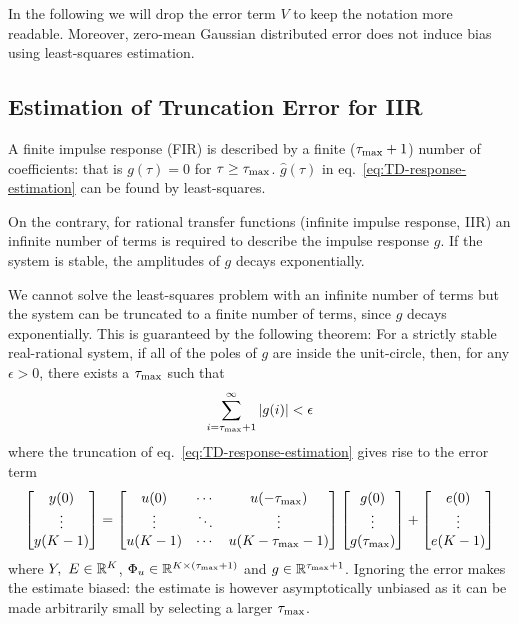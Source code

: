 In the following we will drop the error term $V$ to keep the notation more readable. Moreover, zero-mean Gaussian distributed error does not induce bias using least-squares estimation.

\subsection{Estimation of Truncation Error for IIR}
\label{sec:truncation-error-estimation}

A finite impulse response (FIR) is described by a finite ($\tau_\text{max}+1$) number of coefficients: that is $g(\tau) = 0$ for $\tau \ge \tau_\text{max}$. $\hat{g}(\tau)$ in eq.~\eqref{eq:TD-response-estimation} can be found by least-squares.

On the contrary, for rational transfer functions (infinite impulse response, IIR) an infinite number of terms is required to describe the impulse response $g$. If the system is stable, the amplitudes of $g$ decays exponentially.

We cannot solve the least-squares problem with an infinite number of terms but the system can be truncated to a finite number of terms, since $g$ decays exponentially. This is guaranteed by the following theorem: For a strictly stable real-rational system, if all of the poles of $g$ are inside the unit-circle, then, for any $\epsilon>0$, there exists a $\tau_\text{max}$ such that
\begin{equation*}
  \sum_{i=\tau_\text{max}+1}^\infty |g(i)| < \epsilon
\end{equation*}
where the truncation of eq.~\eqref{eq:TD-response-estimation} gives rise to the error term
\begin{align*}
  \begin{bmatrix}
    y(0) \\ \vdots \\ y(K-1)
  \end{bmatrix} =
  \begin{bmatrix}
    u(0) & \cdots & u(-\tau_\text{max}) \\
    \vdots & \ddots & \vdots \\
    u(K-1) & \cdots & u(K-\tau_\text{max}-1)
  \end{bmatrix}
  \begin{bmatrix}
    g(0) \\ \vdots \\ g(\tau_\text{max})
  \end{bmatrix} +
  \begin{bmatrix}
    e(0) \\ \vdots \\ e(K-1)
  \end{bmatrix}
\end{align*}
where $Y,\ E\in \mathbb{R}^K$, $\Phi_u \in \mathbb{R}^{K\times(\tau_\text{max}+1)}$ and $g \in \mathbb{R}^{\tau_\text{max}+1}$. Ignoring the error makes the estimate biased: the estimate is however asymptotically unbiased as it can be made arbitrarily small by selecting a larger $\tau_\text{max}$.

